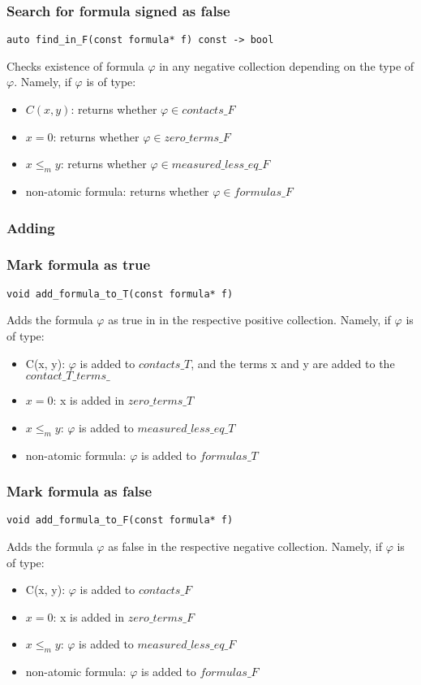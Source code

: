\documentclass{article}
\begin{document}
	\subsubsection*{Search for formula signed as false}
\begin{lstlisting}
auto find_in_F(const formula* f) const -> bool
\end{lstlisting}
	Checks existence of formula $\varphi$ in any negative collection depending on the type of $\varphi$. Namely, if $\varphi$ is of type:
	\begin{itemize}
		\item $C(x, y)$: returns whether $\varphi \in contacts\_F$
		\item $x = 0$: returns whether $\varphi \in zero\_terms\_F$
		\item $x \le_m y$: returns whether $\varphi \in measured\_less\_eq\_F$
		\item non-atomic formula: returns whether $\varphi \in formulas\_F$
	\end{itemize}

	\subsubsection*{Adding}
	\subsubsection*{Mark formula as true}
\begin{lstlisting}
void add_formula_to_T(const formula* f)
\end{lstlisting}
	Adds the formula $\varphi$ as true in in the respective positive collection. Namely, if $\varphi$ is of type:
	\begin{itemize}
		\item C(x, y): $\varphi$ is added to $contacts\_T$, and the terms x and y are added to the $contact\_T\_terms\_$
		\item $x = 0$: x is added in $zero\_terms\_T$
		\item $x \le_m y$: $\varphi$ is added to $measured\_less\_eq\_T$
		\item non-atomic formula: $\varphi$ is added to $formulas\_T$
	\end{itemize}

	\subsubsection*{Mark formula as false}
\begin{lstlisting}
void add_formula_to_F(const formula* f)
\end{lstlisting}
	Adds the formula $\varphi$ as false in the respective negative collection. Namely, if $\varphi$ is of type:
	\begin{itemize}
		\item C(x, y): $\varphi$ is added to $contacts\_F$
		\item $x = 0$: x is added in $zero\_terms\_F$
		\item $x \le_m y$: $\varphi$ is added to $measured\_less\_eq\_F$
		\item non-atomic formula: $\varphi$ is added to $formulas\_F$
	\end{itemize}
\end{document}

